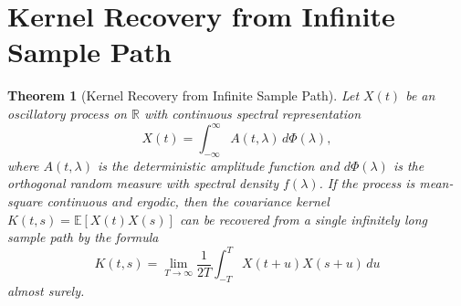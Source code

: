 \documentclass{article}
\newtheorem{theorem}{Theorem}
\begin{document}
\section{Kernel Recovery from Infinite Sample Path}

\begin{theorem}[Kernel Recovery from Infinite Sample Path]
Let $X(t)$ be an oscillatory process on $\mathbb{R}$ with continuous spectral representation
\[
X(t) = \int_{-\infty}^\infty A(t,\lambda)\, d\Phi(\lambda),
\]
where $A(t,\lambda)$ is the deterministic amplitude function and $d\Phi(\lambda)$ is the orthogonal random measure with spectral density $f(\lambda)$. If the process is mean-square continuous and ergodic, then the covariance kernel $K(t,s) = \mathbb{E}[X(t)X(s)]$ can be recovered from a single infinitely long sample path by the formula
\[
K(t,s) = \lim_{T\to\infty} \frac{1}{2T} \int_{-T}^T X(t+u) X(s+u)\, du
\]
almost surely.
\end{theorem}
\end{document}
